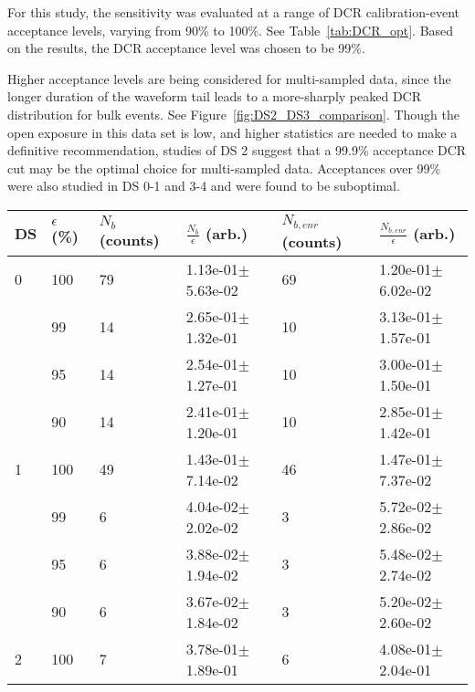 For this study, the sensitivity was evaluated at a range of DCR calibration-event acceptance levels, varying from 90\% to 100\%. See Table~\ref{tab:DCR_opt}. Based on the results, the DCR acceptance level was chosen to be 99\%. 

Higher acceptance levels are being considered for multi-sampled data, since the longer duration of the waveform tail leads to a more-sharply peaked DCR distribution for bulk events. See Figure~\ref{fig:DS2_DS3_comparison}. Though the open exposure in this data set is low, and higher statistics are needed to make a definitive recommendation, studies of DS 2 suggest that a 99.9\% acceptance DCR cut may be the optimal choice for multi-sampled data. Acceptances over 99\% were also studied in DS 0-1 and 3-4 and were found to be suboptimal. 

\begin{table}[]
\centering
\begin{tabular}{l l | l l l l}
DS &  $\epsilon$ (\%) & $N_{b}$ (counts) & $\frac{N_{b}}{\epsilon}$ (arb.) & $N_{b, enr}$ (counts) &$\frac{N_{b, enr}}{\epsilon}$ (arb.) \\    
\hline
0 &                  100 &        79 &             1.13e-01$\pm$5.63e-02 &                   69 &             1.20e-01$\pm$6.02e-02 \\
 &                   99 &        14 &             2.65e-01$\pm$1.32e-01 &                   10 &             3.13e-01$\pm$1.57e-01 \\
 &                   95 &        14 &             2.54e-01$\pm$1.27e-01 &                   10 &             3.00e-01$\pm$1.50e-01 \\
 &                   90 &        14 &             2.41e-01$\pm$1.20e-01 &                   10 &             2.85e-01$\pm$1.42e-01 \\
\hline
1 &                  100 &      49 &             1.43e-01$\pm$7.14e-02 &                   46 &             1.47e-01$\pm$7.37e-02 \\
 &                   99 &       6 &             4.04e-02$\pm$2.02e-02 &                    3 &             5.72e-02$\pm$2.86e-02 \\
 &                   95 &       6 &             3.88e-02$\pm$1.94e-02 &                    3 &             5.48e-02$\pm$2.74e-02 \\
 &                   90 &       6 &             3.67e-02$\pm$1.84e-02 &                    3 &             5.20e-02$\pm$2.60e-02 \\
\hline               
2 &                  100 &      7 &             3.78e-01$\pm$1.89e-01 &                    6 &             4.08e-01$\pm$2.04e-01 \\

\end{tabular}
\end{table}
